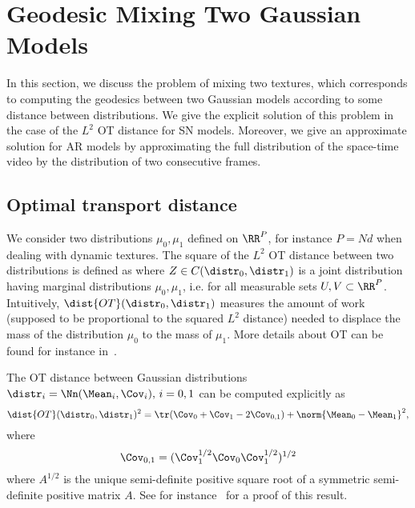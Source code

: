 
\section{Geodesic Mixing Two Gaussian Models}
\label{sec-geodesic}

In this section, we discuss the problem of mixing two textures, which corresponds to computing the geodesics between two Gaussian models according to some distance between distributions. We give the explicit solution of this problem in the case of the $L^2$ OT distance for SN models. Moreover, we give an approximate solution for AR models by approximating the full distribution of the space-time video by the distribution of two consecutive frames.


\subsection{Optimal transport distance}

We consider two distributions $\mu_0,\mu_1$ defined on $\RR^P$, for instance $P=Nd$ when dealing with dynamic textures. The square of the $L^2$ OT distance between two distributions is defined as
where $Z \in C( \distr_0,\distr_1 )$ is a joint distribution having marginal distributions $\mu_0,\mu_1$, i.e.
for all measurable sets $U,V \subset \RR^P$. Intuitively, $\dist{OT}(\distr_0,\distr_1)$ measures the amount of work (supposed to be proportional to the squared $L^2$ distance) needed to displace the mass of the distribution $\mu_0$ to the mass of $\mu_1$. More details about OT can be found for instance in~\cite{villani-topics}.

The OT distance between Gaussian distributions $\distr_i = \Nn(\Mean_i,\Cov_i), \, i=0, 1$ can be computed explicitly as
\begin{equation}
\label{eq-OT-dist}
	\dist{OT}(\distr_0,\distr_1)^2 = \tr(\Cov_0 + \Cov_1 - 2 \Cov_{0,1}) + \norm{\Mean_0-\Mean_1}^2,
\end{equation}
where
\begin{equation}
\label{eq-c01}
    \Cov_{0,1} =  ( \Cov_1^{1/2} \Cov_0 \Cov_1^{1/2} )^{1/2}
\end{equation}
where $A^{1/2}$ is the unique semi-definite positive square root of a symmetric semi-definite positive matrix $A$. See for instance~\cite{gowson-transport-gaussian} for a proof of this result. 

